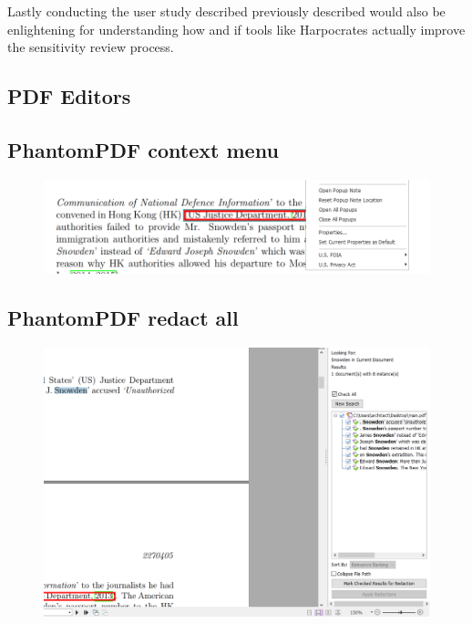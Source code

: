 \documentclass[\version]{l4proj}
\begin{document}
Lastly conducting the user study described previously described would also be enlightening for understanding how and if tools like Harpocrates actually improve the sensitivity review process.

%
% 

\begin{appendices}
    \chapter{PDF Editors}
    \section{PhantomPDF context menu}\label{fig:foxit-menu}
    \begin{figure}[H]
        \centering
        \includegraphics[width=0.7\linewidth]{images/related_products/foxit_redaction.png}
    \end{figure}
    \section{PhantomPDF redact all}\label{fig:foxit-redact-all}
    \begin{figure}[H]
        \centering
        \includegraphics[width=0.7\linewidth]{images/related_products/foxit_redact_all.png}
    \end{figure}

\end{appendices}
\end{document}

